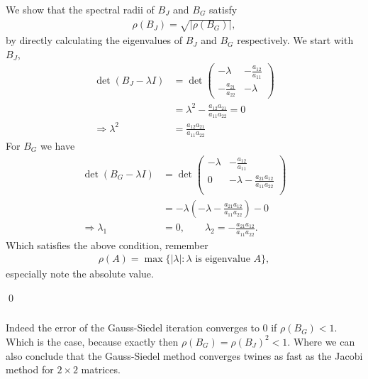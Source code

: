 \subsubsection{}
We show that the spectral radii of $B_J$ and $B_G$ satisfy
\begin{align}
    \rho (B_J) = \sqrt{\left| \rho(B_G) \right| },
\end{align}
by directly calculating the eigenvalues of $B_J$ and $B_G$ respectively.
We start with $B_J$,
\begin{align}
    \det(B_J - \lambda I)
    &= \det
    \begin{pmatrix} -\lambda &
    -\frac{a_{12}}{a_{11}} \\ -\frac{a_{21}}{a_{22}} & -\lambda
    \end{pmatrix}\\
    &= \lambda^2 - \frac{a_{12}a_{21}}{a_{11}a_{22}} = 0\\
        \Rightarrow \lambda^2 &=  \frac{a_{12}a_{21}}{a_{11}a_{22}}
\end{align}
For $B_G$ we have
\begin{align}
    \det(B_G - \lambda I)
    &= \det
    \begin{pmatrix}
        -\lambda & -\frac{a_{12}}{a_{11}} \\ 0 & -\lambda -
        \frac{a_{21}a_{12}}{a_{11}a_{22}}\\
    \end{pmatrix}\\
    &= -\lambda \left(-\lambda -  \frac{a_{21}a_{12}}{a_{11}a_{22}}\right) - 0
    \\
    \Rightarrow \lambda_1 &= 0, \qquad \lambda_2 = -
    \frac{a_{21}a_{12}}{a_{11}a_{22}}.
\end{align}
Which satisfies the above condition, remember
\begin{align}
    \rho(A) = \max\{ \left| \lambda \right| : \text{$\lambda$ is eigenvalue
    $A$}\},
\end{align}
especially note the absolute value.

\qed
\subsubsection{}
Indeed the error of the Gauss-Siedel iteration converges to $0$ if $\rho(B_G)
< 1$. Which is the case, because exactly then $\rho(B_G) = \rho(B_J)^2 < 1$.
Where we can also conclude that the Gauss-Siedel method converges twines as
fast as the Jacobi method for $2 \times 2$ matrices.
